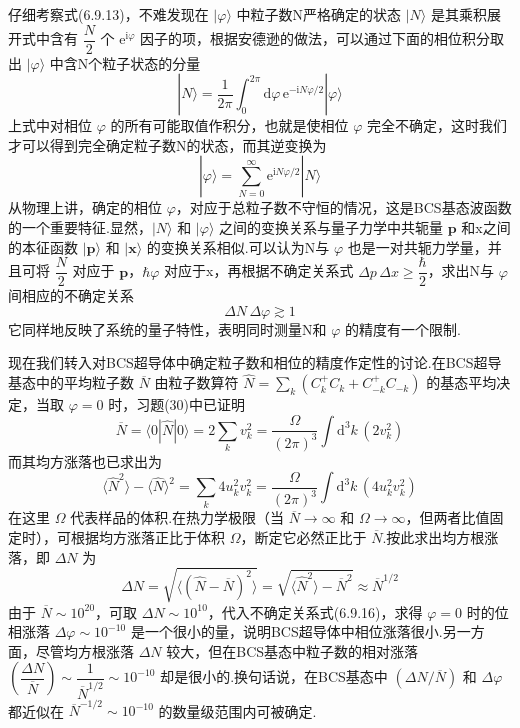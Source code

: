 仔细考察式(6.9.13)，不难发现在 $|\varphi\rangle$ 中粒子数N严格确定的状态 $|N\rangle$ 是其乘积展开式中含有 $\dfrac{N}{2}$ 个 $\mathrm{e}^{\mathrm{i}\varphi}$ 因子的项，根据安德逊的做法，可以通过下面的相位积分取出 $|\varphi\rangle$ 中含N个粒子状态的分量
\begin{equation}
  |N\rangle=\frac{1}{2\pi}\int_{0}^{2\pi}\mathrm{d}\varphi\,
  \mathrm{e}^{-\mathrm{i}N\varphi/2}|\varphi\rangle
\end{equation}
上式中对相位 $\varphi$ 的所有可能取值作积分，也就是使相位 $\varphi$ 完全不确定，这时我们才可以得到完全确定粒子数N的状态，而其逆变换为
\begin{equation}
  |\varphi\rangle=\sum_{N=0}^{\infty}\mathrm{e}^{\mathrm{i}N\varphi/2}|N\rangle
\end{equation}
从物理上讲，确定的相位 $\varphi$，对应于总粒子数不守恒的情况，这是BCS基态波函数的一个重要特征.显然，$|N\rangle$ 和 $|\varphi\rangle$ 之间的变换关系与量子力学中共轭量 $\boldsymbol{p}$ 和x之间的本征函数 $|\boldsymbol{p}\rangle$ 和 $|\boldsymbol{x}\rangle$ 的变换关系相似.可以认为N与 $\varphi$ 也是一对共轭力学量，并且可将 $\dfrac{N}{2}$ 对应于 $\boldsymbol{p}$，$\hbar\varphi$ 对应于x，再根据不确定关系式
$\Delta p\,\Delta x\geqslant\dfrac{\hbar}{2}$，求出N与 $\varphi$ 间相应的不确定关系
\begin{equation}
  \Delta N\,\Delta\varphi\gtrsim1
\end{equation}
它同样地反映了系统的量子特性，表明同时测量N和 $\varphi$ 的精度有一个限制.

现在我们转入对BCS超导体中确定粒子数和相位的精度作定性的讨论.在BCS超导基态中的平均粒子数 $\overline{N}$ 由粒子数算符
$\hat{N}=\sum_{k}\left(C^{+}_{k}C_{k}+C^{+}_{-k}C_{-k}\right)$
的基态平均决定，当取 $\varphi=0$ 时，习题(30)中已证明
\begin{equation}
  \overline{N}=\langle0|\hat{N}|0\rangle
  =2\sum_{k}v_{k}^{2}
  =\frac{\Omega}{(2\pi)^{3}}\int\mathrm{d}^{3}k\,\left(2v_{k}^{2}\right)
\end{equation}
而其均方涨落也已求出为
\begin{equation}
  \langle\hat{N}^{2}\rangle-\langle\hat{N}\rangle^{2}
  =\sum_{k}4u_{k}^{2}v_{k}^{2}
  =\frac{\Omega}{(2\pi)^{3}}\int\mathrm{d}^{3}k\,
  \left(4u_{k}^{2}v_{k}^{2}\right)
\end{equation}
在这里 $\Omega$ 代表样品的体积.在热力学极限（当 $\overline{N}\to\infty$ 和 $\Omega\to\infty$，但两者比值固定时），可根据均方涨落正比于体积 $\Omega$，断定它必然正比于 $\overline{N}$.按此求出均方根涨落，即 $\Delta N$ 为
\begin{equation}
  \Delta N=\sqrt{\langle(\hat{N}-\overline{N})^{2}\rangle}
  =\sqrt{\langle\hat{N}^{2}\rangle-\overline{N}^{2}}
  \approx\overline{N}^{1/2}
\end{equation}
由于 $\overline{N}\sim10^{20}$，可取 $\Delta N\sim10^{10}$，代入不确定关系式(6.9.16)，求得 $\varphi=0$ 时的位相涨落 $\Delta\varphi\sim10^{-10}$ 是一个很小的量，说明BCS超导体中相位涨落很小.另一方面，尽管均方根涨落 $\Delta N$ 较大，但在BCS基态中粒子数的相对涨落
$\left(\dfrac{\Delta N}{\overline{N}}\right)\sim\dfrac{1}{\overline{N}^{1/2}}
\sim10^{-10}$ 却是很小的.换句话说，在BCS基态中 $\left(\Delta N/\overline{N}\right)$ 和 $\Delta\varphi$ 都近似在 $\overline{N}^{-1/2}\sim10^{-10}$ 的数量级范围内可被确定.

